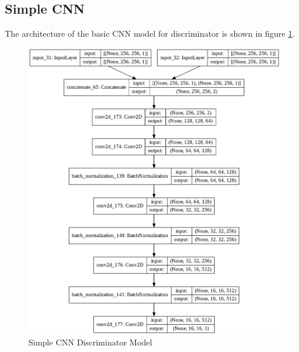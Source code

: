             \subsection{Simple CNN}
                The architecture of the basic CNN model for discriminator is shown in figure \ref{fig:Simple CNN Discriminator Model}. 
                \begin{figure}[h]
                    \centering
                    \includegraphics[width=.9\textwidth]{img/experiments/CNNDiscriminator_Model.png}
                    \caption{Simple CNN Discriminator Model}
                    \label{fig:Simple CNN Discriminator Model}
                \end{figure}
                
